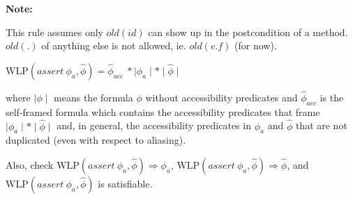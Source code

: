 \documentclass {article}
\newcommand{\fphi}{\widehat{\phi}}
\newcommand{\imp}{\Rightarrow}
\newcommand{\wlp}[2]{\text{WLP}(#1,#2)}
\begin{document}
\textbf{Note:}

This rule assumes only $old(id)$ can show up in the postcondition of a method. $old(.)$ of anything else is not allowed, ie. $old(e.f)$ (for now).

\vspace{0.5cm}

$\wlp{assert\ \phi_a}{\fphi} = \fphi_{acc} \ \ast \mid \phi_a \mid \ast \mid \fphi \mid$


where $\mid \phi \mid$ means the formula $\phi$ without accessibility predicates and $\fphi_{acc}$ is the self-framed formula which contains the accessibility predicates that frame $\mid \phi_a \mid \ast \mid \fphi \mid$ and, in general, the accessibility predicates in $\phi_a$ and $\fphi$ that are not duplicated (even with respect to aliasing).

Also, check $\wlp{assert\ \phi_a}{\fphi} \imp \phi_a$, $\wlp{assert\ \phi_a}{\fphi} \imp \fphi$, and $\wlp{assert\ \phi_a}{\fphi}$ is satisfiable.
\end{document}
